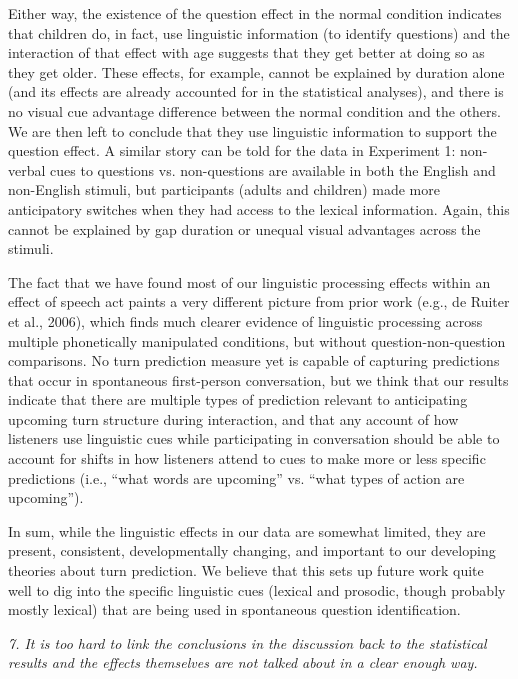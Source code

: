 \documentclass[11pt,a4paper]{letter} %
\begin{document}
\begin{letter}{}
Either way, the existence of the question effect in the normal condition indicates that children do, in fact, use linguistic information (to identify questions) and the interaction of that effect with age suggests that they get better at doing so as they get older. These effects, for example, cannot be explained by duration alone (and its effects are already accounted for in the statistical analyses), and there is no visual cue advantage difference between the normal condition and the others. We are then left to conclude that they use linguistic information to support the question effect. A similar story can be told for the data in Experiment 1: non-verbal cues to questions vs. non-questions are available in both the English and non-English stimuli, but participants (adults and children) made more anticipatory switches when they had access to the lexical information. Again, this cannot be explained by gap duration or unequal visual advantages across the stimuli.

The fact that we have found most of our linguistic processing effects within an effect of speech act paints a very different picture from prior work (e.g., de Ruiter et al., 2006), which finds much clearer evidence of linguistic processing across multiple phonetically manipulated conditions, but without question-non-question comparisons. No turn prediction measure yet is capable of capturing predictions that occur in spontaneous first-person conversation, but we think that our results indicate that there are multiple types of prediction relevant to anticipating upcoming turn structure during interaction, and that any account of how listeners use linguistic cues while participating in conversation should be able to account for shifts in how listeners attend to cues to make more or less specific predictions (i.e., ``what words are upcoming'' vs. ``what types of action are upcoming'').

In sum, while the linguistic effects in our data are somewhat limited, they are present, consistent, developmentally changing, and important to our developing theories about turn prediction. We believe that this sets up future work quite well to dig into the specific linguistic cues (lexical and prosodic, though probably mostly lexical) that are being used in spontaneous question identification.

\smallskip

\noindent \textit{7. It is too hard to link the conclusions in the discussion back to the statistical results and the effects themselves are not talked about in a clear enough way.}


\end{letter}
\end{document}
